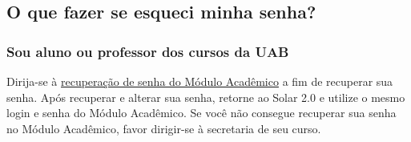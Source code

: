 \documentclass[letterpaper,10pt,english]{sphinxmanual}
\begin{document}
\subsection{O que fazer se esqueci minha senha?}
\label{faq:o-que-fazer-se-esqueci-minha-senha}

\subsubsection{Sou aluno ou professor dos cursos da UAB}
\label{faq:sou-aluno-ou-professor-dos-cursos-da-uab}
Dirija-se à \href{https://www.moduloacademico.ufc.br/moduloacademico/guest/recuperarSenhaForm.do}{recuperação de senha do Módulo Acadêmico} a fim de recuperar sua senha. Após recuperar e alterar sua senha, retorne ao Solar 2.0 e utilize o mesmo login e senha do Módulo Acadêmico. Se você não consegue recuperar sua senha no Módulo Acadêmico, favor dirigir-se à secretaria de seu curso.
\end{document}
